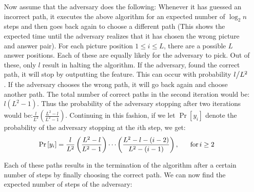 \documentclass{llncs}
\begin{document}
Now assume that the adversary does the following: Whenever it has guessed an incorrect path, it executes the above algorithm for an expected number of $\log _2 n$ steps and then goes back again to choose a different path (This shows the expected time until the adversary realizes that it has chosen the wrong picture and answer pair). For each picture position $1 \le i \le L$, there are a possible $L$ answer positions. Each of these are equally likely for the adversary to pick. Out of these, only $l$ result in halting the algorithm. If the adversary, found the correct path, it will stop by outputting the feature. This can occur with probability ${l \mathord{\left/
 {\vphantom {l {L^2 }}} \right.
 \kern-\nulldelimiterspace} {L^2 }}$. If the adversary chooses the wrong path, it will go back again and choose another path. The total number of correct paths in the second iteration would be: $l\left( {L^2  - 1} \right)$. Thus the probability of the adversary stopping after two iterations would be:$\frac{l}{{L^2 }}\left( {\frac{{L^2  - l}}{{L^2  - 1}}} \right)$. Continuing in this fashion, if we let $\Pr \left[ {y_i } \right]$ denote the probability of the adversary stopping at the $i$th step, we get:
\[
\Pr \left[ {y_i } \right] = \frac{l}{{L^2 }}\left( {\frac{{L^2  - l}}{{L^2  - 1}}} \right) \cdots \left( {\frac{{L^2  - l - \left( {i - 2} \right)}}{{L^2  - \left( {i - 1} \right)}}} \right),\,\,\,\,\,\,\,\,\,\,{\rm{for}}\,i \ge 2
\]

Each of these paths results in the termination of the algorithm after a certain number of steps by finally choosing the correct path. We can now find the expected number of steps of the adversary:
 
\end{document}

